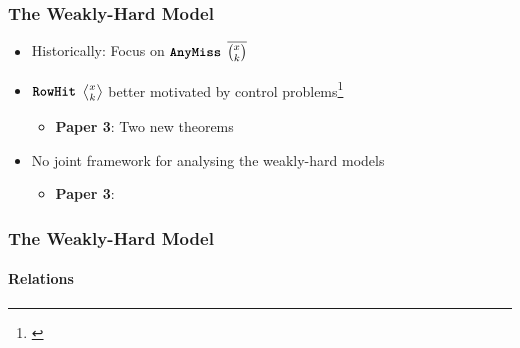 \begin{frame}
    \frametitle{The Weakly-Hard Model}

    \begin{itemize}\setlength\itemsep{1em}
        \item Historically: Focus on $\texttt{\textbf{AnyMiss}}{}$ $\overline{\binom{x_{}}{k_{}}}$
        \item $\texttt{\textbf{RowHit}}{}$ $\rowhit{}$ better motivated by control problems\footnote{\cite{Linsenmayer:2021,Vreman:2021}}
            \begin{itemize}
                \item \textbf{Paper 3}: Two new theorems
            \end{itemize}
        \item No joint framework for analysing the weakly-hard models
            \begin{itemize}
                \item \textbf{Paper 3}: \tool{}
            \end{itemize}
    \end{itemize}
\end{frame}


\begin{frame}
    \frametitle{The Weakly-Hard Model}
    \framesubtitle{Relations}
    \begin{figure}[h]
        \centering
        \only<2>{}%
        \only<3>{}%
    \end{figure}
\end{frame}


